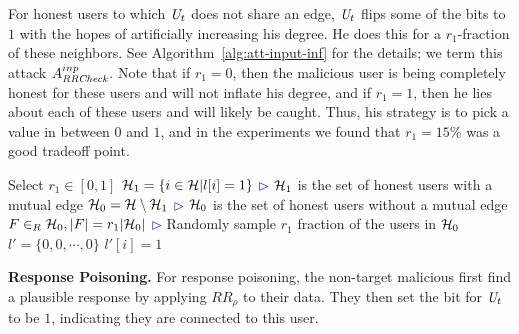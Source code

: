 For honest users to which $\textit{U}_t$ does not share an edge, $\textit{U}_t$ flips some of the bits to $1$ with the hopes of artificially increasing his degree. He does this for a $r_1$-fraction of these neighbors. See Algorithm~\ref{alg:att-input-inf} for the details; we term this attack $A_{\textit{RRCheck}}^{inp}$. Note that if $r_1 = 0$, then the malicious user is being completely honest for these users and will not inflate his degree, and if $r_1 = 1$, then he lies about each of these users and will likely be caught. Thus, his strategy is to pick a value in between $0$ and $1$, and in the experiments we found that $r_1 = 15\%$ was a good tradeoff point.

%  
%

\begin{algorithm}[bt]
Select $r_1\in [0,1]$\;
$\mathcal{H}_1=\{i \in \mathcal{H}| l[i]=1\}$\;
\hfill\textcolor{blue}{$\rhd$} $\mathcal{H}_1$ is the set of honest users with a mutual edge\;
$\mathcal{H}_0=\mathcal{H}\setminus\mathcal{H}_1$\;
\hfill\textcolor{blue}{$\rhd$} $\mathcal{H}_0$ is the set of honest users without a mutual edge\;
$F\in_R \mathcal{H}_0, |F|=r_1|\mathcal{H}_0|$\;
\hfill\textcolor{blue}{$\rhd$} Randomly sample $r_1$ fraction of the users in $\mathcal{H}_0$\;
$l'=\{0,0,\cdots, 0\}$\;
 {
$l'[i]=1$ \;
}
  \caption{$A_{\DegRRCheck}^{inp}: \{0,1\}^n\mapsto\{0,1\}^n$ }\label{alg:att-input-inf}
\end{algorithm}
\noindent \textbf{Response Poisoning.}  For response poisoning, the non-target malicious first find a plausible response by applying $RR_\rho$ to their data. They then set the bit for $\textit{U}_t$ to be $1$, indicating they are connected to this user.

